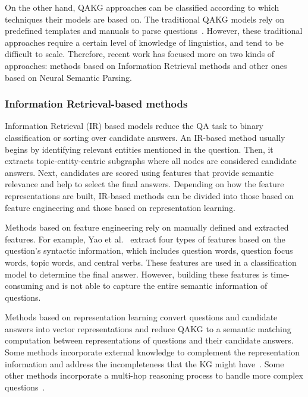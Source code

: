 On the other hand, QAKG approaches can be classified according to which techniques their models 
are based on. The traditional QAKG models rely on predefined templates and manuals to parse 
questions~\cite{qa:core-techniques-DiefenbachLSM18}. However, these traditional approaches require 
a certain level of knowledge of linguistics, and tend to be difficult to scale. Therefore, recent 
work has focused more on two kinds of approaches: methods based on Information Retrieval methods 
and other ones based on Neural Semantic Parsing.

\subsubsection{Information Retrieval-based methods}
\label{cap2:qakg/approaches/infRetrieval}
Information Retrieval (IR) based models reduce the QA task to binary classification or sorting 
over candidate answers. An IR-based method usually begins by identifying relevant entities 
mentioned in the question. Then, it extracts topic-entity-centric subgraphs where all nodes are 
considered candidate answers. Next, candidates are scored using features that provide semantic 
relevance and help to select the final answers. Depending on how the feature representations 
are built, IR-based methods can be divided into those based on feature engineering and those 
based on representation learning.

Methods based on feature engineering rely on manually defined and extracted features. For 
example, Yao et al.~\cite{qa:YaoD14} extract four types of features based on the question’s 
syntactic information, which includes question words, question focus words, topic words, and 
central verbs. These features are used in a classification model to determine the final answer. 
However, building these features is time-consuming and is not able to capture the entire 
semantic information of questions.

Methods based on representation learning convert questions and candidate answers into vector 
representations and reduce QAKG to a semantic matching computation between representations of 
questions and their candidate answers. Some methods incorporate external knowledge to complement 
the representation information and address the incompleteness that the KG might 
have~\cite{qa:XuRFHZ16,qa:SunDZMSC18,qa:TrouillonWRGB16}. Some other methods incorporate a 
multi-hop reasoning process to handle more complex questions~\cite{qa:SukhbaatarSWF15,qa:MillerFDKBW16,qa:QiuWJZ20}.

